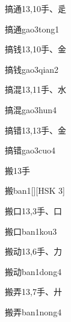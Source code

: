 \begin{entry}{搞通}{13,10}{⼿、⾡}
  \begin{phonetics}{搞通}{gao3tong1}
  \end{phonetics}
\end{entry}

\begin{entry}{搞钱}{13,10}{⼿、⾦}
  \begin{phonetics}{搞钱}{gao3qian2}
  \end{phonetics}
\end{entry}

\begin{entry}{搞混}{13,11}{⼿、⽔}
  \begin{phonetics}{搞混}{gao3hun4}
  \end{phonetics}
\end{entry}

\begin{entry}{搞错}{13,13}{⼿、⾦}
  \begin{phonetics}{搞错}{gao3cuo4}
  \end{phonetics}
\end{entry}

\begin{entry}{搬}{13}{⼿}
  \begin{phonetics}{搬}{ban1}[][HSK 3]
  \end{phonetics}
\end{entry}

\begin{entry}{搬口}{13,3}{⼿、⼝}
  \begin{phonetics}{搬口}{ban1kou3}
  \end{phonetics}
\end{entry}

\begin{entry}{搬动}{13,6}{⼿、⼒}
  \begin{phonetics}{搬动}{ban1dong4}
  \end{phonetics}
\end{entry}

\begin{entry}{搬弄}{13,7}{⼿、⼶}
  \begin{phonetics}{搬弄}{ban1nong4}
  \end{phonetics}
\end{entry}

